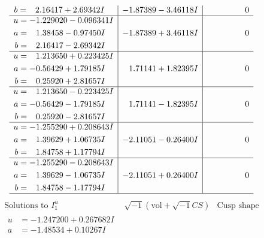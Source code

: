 \documentclass[1p]{elsarticle_modified}
\theoremstyle{definition}
\newcommand{\I}{\sqrt{-1}}
\begin{document}
$$\begin{array}{c|c|c}
\begin{aligned}
b &= \phantom{-}2.16417 + 2.69342 I\end{aligned}
 & -1.87389 - 3.46118 I & \phantom{-0.000000 } 0 \\ \hline\begin{aligned}
u &= -1.229020 - 0.096341 I \\
a &= \phantom{-}1.38458 - 0.97450 I \\
b &= \phantom{-}2.16417 - 2.69342 I\end{aligned}
 & -1.87389 + 3.46118 I & \phantom{-0.000000 } 0 \\ \hline\begin{aligned}
u &= \phantom{-}1.213650 + 0.223425 I \\
a &= -0.56429 + 1.79185 I \\
b &= \phantom{-}0.25920 + 2.81657 I\end{aligned}
 & \phantom{-}1.71141 + 1.82395 I & \phantom{-0.000000 } 0 \\ \hline\begin{aligned}
u &= \phantom{-}1.213650 - 0.223425 I \\
a &= -0.56429 - 1.79185 I \\
b &= \phantom{-}0.25920 - 2.81657 I\end{aligned}
 & \phantom{-}1.71141 - 1.82395 I & \phantom{-0.000000 } 0 \\ \hline\begin{aligned}
u &= -1.255290 + 0.208643 I \\
a &= \phantom{-}1.39629 + 1.06735 I \\
b &= \phantom{-}1.84758 + 1.17794 I\end{aligned}
 & -2.11051 - 0.26400 I & \phantom{-0.000000 } 0 \\ \hline\begin{aligned}
u &= -1.255290 - 0.208643 I \\
a &= \phantom{-}1.39629 - 1.06735 I \\
b &= \phantom{-}1.84758 - 1.17794 I\end{aligned}
 & -2.11051 + 0.26400 I & \phantom{-0.000000 } 0\\
 \hline 
 \end{array}$$\newpage$$\begin{array}{c|c|c}  
\text{Solutions to }I^u_{1}& \I (\text{vol} + \sqrt{-1}CS) & \text{Cusp shape}\\
 \hline 
\begin{aligned}
u &= -1.247200 + 0.267682 I \\
a &= -1.48534 + 0.10267 I \\

\end{aligned}
\end{array}$$
\end{document}
